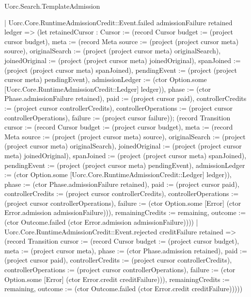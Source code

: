 \begin{lexlean}{Uorc.Search.TemplateAdmission}
\begin{semanticmodule}
{    | Uorc.Core.RuntimeAdmissionCredit::Event.failed admissionFailure retained ledger => (let retainedCursor : Cursor := (record Cursor {budget := (project cursor budget), meta := (record Meta {source := (project (project cursor meta) source), originalSearch := (project (project cursor meta) originalSearch), joinedOriginal := (project (project cursor meta) joinedOriginal), spanJoined := (project (project cursor meta) spanJoined), pendingEvent := (project (project cursor meta) pendingEvent), admissionLedger := (ctor Option.some [Uorc.Core.RuntimeAdmissionCredit::Ledger] ledger)}), phase := (ctor Phase.admissionFailure retained), paid := (project cursor paid), controllerCredits := (project cursor controllerCredits), controllerOperations := (project cursor controllerOperations), failure := (project cursor failure)}); (record Transition {cursor := (record Cursor {budget := (project cursor budget), meta := (record Meta {source := (project (project cursor meta) source), originalSearch := (project (project cursor meta) originalSearch), joinedOriginal := (project (project cursor meta) joinedOriginal), spanJoined := (project (project cursor meta) spanJoined), pendingEvent := (project (project cursor meta) pendingEvent), admissionLedger := (ctor Option.some [Uorc.Core.RuntimeAdmissionCredit::Ledger] ledger)}), phase := (ctor Phase.admissionFailure retained), paid := (project cursor paid), controllerCredits := (project cursor controllerCredits), controllerOperations := (project cursor controllerOperations), failure := (ctor Option.some [Error] (ctor Error.admission admissionFailure))}), remainingCredits := remaining, outcome := (ctor Outcome.failed (ctor Error.admission admissionFailure))}))
    | Uorc.Core.RuntimeAdmissionCredit::Event.rejected creditFailure retained => (record Transition {cursor := (record Cursor {budget := (project cursor budget), meta := (project cursor meta), phase := (ctor Phase.admission retained), paid := (project cursor paid), controllerCredits := (project cursor controllerCredits), controllerOperations := (project cursor controllerOperations), failure := (ctor Option.some [Error] (ctor Error.credit creditFailure))}), remainingCredits := remaining, outcome := (ctor Outcome.failed (ctor Error.credit creditFailure))})))
}


\end{semanticmodule}
\end{lexlean}
